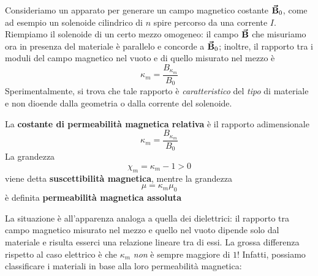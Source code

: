 Consideriamo un apparato per generare un campo magnetico costante $\vb*{\va{B}}_0$, come ad esempio un solenoide cilindrico di $n$ spire percorso da una corrente $I$.
Riempiamo il solenoide di un certo mezzo omogeneo: il campo $\vb*{\va{B}}$ che misuriamo ora in presenza del materiale è parallelo e concorde a $\vb*{\va{B}}_0$; inoltre, il rapporto tra i moduli del campo magnetico nel vuoto e di quello misurato nel mezzo è
\begin{equation}
	\kappa_m=\frac{B_{\kappa_m}}{B_0}\label{CostantePermRelativaDef}
\end{equation}
Sperimentalmente, si trova che tale rapporto è \textit{caratteristico} del \textit{tipo} di materiale e non dioende dalla geometria o dalla corrente del solenoide.
\begin{define}
	La \textbf{costante di permeabilità magnetica relativa} è il rapporto adimensionale
	\begin{equation}
		\kappa_m=\frac{B_{\kappa_m}}{B_0}
	\end{equation}
	La grandezza
	\begin{equation}
		\chi_m=\kappa_m - 1>0
	\end{equation}
	viene detta \textbf{suscettibilità magnetica}, mentre la grandezza
	\begin{equation}
		\mu=\kappa_m\mu_0
	\end{equation}
	è definita \textbf{permeabilità magnetica assoluta}
\end{define}
La situazione è all'apparenza analoga a quella dei dielettrici: il rapporto tra campo magnetico misurato nel mezzo e quello nel vuoto dipende solo dal materiale e risulta esserci una relazione lineare tra di essi.
La grossa differenza rispetto al caso elettrico è che $\kappa_m$ \textit{non} è sempre maggiore di $1$! Infatti, possiamo classificare i materiali in base alla loro permeabilità magnetica:
